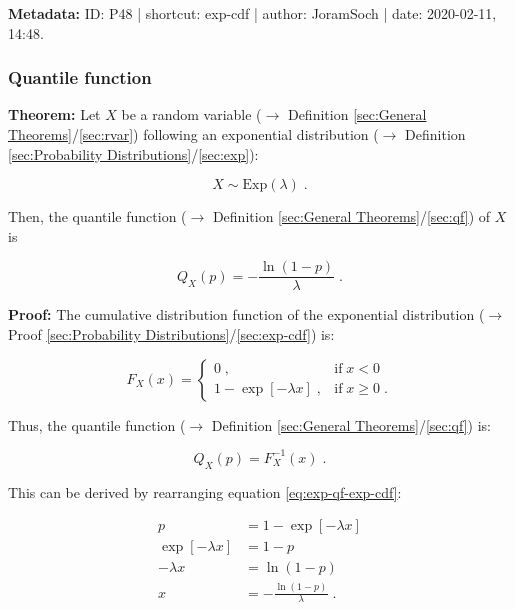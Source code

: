 \documentclass[a4paper,12pt,twoside]{book}
\begin{document}
\vspace{1em}
\textbf{Metadata:} ID: P48 | shortcut: exp-cdf | author: JoramSoch | date: 2020-02-11, 14:48.
\vspace{1em}



\subsubsection[\textbf{Quantile function}]{Quantile function} \label{sec:exp-qf}
\setcounter{equation}{0}

\textbf{Theorem:} Let $X$ be a random variable ($\rightarrow$ Definition \ref{sec:General Theorems}/\ref{sec:rvar}) following an exponential distribution ($\rightarrow$ Definition \ref{sec:Probability Distributions}/\ref{sec:exp}):

\begin{equation} \label{eq:exp-qf-exp}
X \sim \mathrm{Exp}(\lambda) \; .
\end{equation}

Then, the quantile function ($\rightarrow$ Definition \ref{sec:General Theorems}/\ref{sec:qf}) of $X$ is

\begin{equation} \label{eq:exp-qf-exp-qf}
Q_X(p) = -\frac{\ln(1-p)}{\lambda} \; .
\end{equation}


\vspace{1em}
\textbf{Proof:} The cumulative distribution function of the exponential distribution ($\rightarrow$ Proof \ref{sec:Probability Distributions}/\ref{sec:exp-cdf}) is:

\begin{equation} \label{eq:exp-qf-exp-cdf}
F_X(x) = \left\{
\begin{array}{rl}
0 \; , & \text{if} \; x < 0 \\
1 - \exp[-\lambda x] \; , & \text{if} \; x \geq 0 \; .
\end{array}
\right.
\end{equation}

Thus, the quantile function ($\rightarrow$ Definition \ref{sec:General Theorems}/\ref{sec:qf}) is:

\begin{equation} \label{eq:exp-qf-exp-qf-s1}
Q_X(p) = F_X^{-1}(x) \; .
\end{equation}

This can be derived by rearranging equation \eqref{eq:exp-qf-exp-cdf}:

\begin{equation} \label{eq:exp-qf-exp-qf-s2}
\begin{split}
p &= 1 - \exp[-\lambda x] \\
\exp[-\lambda x] &= 1-p \\
-\lambda x &= \ln(1-p) \\
x &= -\frac{\ln(1-p)}{\lambda} \; .
\end{split}
\end{equation}
\end{document}
